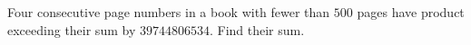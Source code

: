 Four consecutive page numbers in a book with fewer than $ 500 $ pages have product exceeding their sum by $ 39744806534 $. Find their sum.
